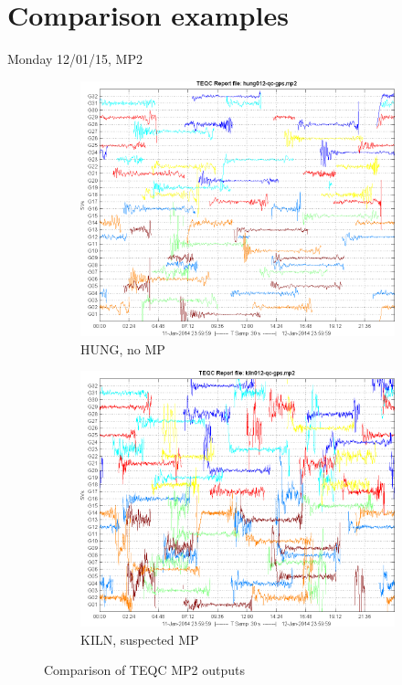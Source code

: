 \documentclass[11pt]{beamer}
\begin{document}
\section{Comparison examples}
	

\begin{frame}{Monday 12/01/15, MP2}
	\begin{figure}
		\centering
		\begin{subfigure}{.5\textwidth}
			\centering
			\includegraphics[width=\textwidth]{pic/hung012_qc_gps_mp2.png}
			\caption{HUNG, no MP}
			\label{fig:sub1}
		\end{subfigure}%
		\begin{subfigure}{.5\textwidth}
			\centering
			\includegraphics[width=\textwidth]{pic/kiln012_qc_gps_mp2.png}
			\caption{KILN, suspected MP}
			\label{fig:sub2}
		\end{subfigure}
		\caption{Comparison of TEQC MP2 outputs}
	\end{figure}
\end{frame}
\end{document}
